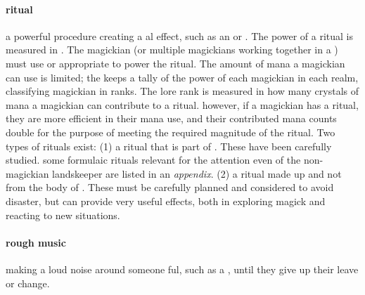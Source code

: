 \paragraph{ritual} a powerful procedure creating a al effect, such as an  or . The power of a ritual is measured in . The magickian (or multiple magickians working together in a ) must use  or appropriate  to power the ritual. The amount of mana a magickian can use is limited; the  keeps a tally of the power of each magickian in each realm, classifying magickian in  ranks. The lore rank is measured in how many crystals of mana a magickian can contribute to a ritual. however, if a magickian has  a ritual, they are more efficient in their mana use, and their contributed mana counts double for the purpose of meeting the required magnitude of the ritual. Two types of rituals exist: (1)  a ritual that is part of . These have been carefully studied. some formulaic rituals relevant for the attention even of the non-magickian landskeeper are listed in an \emph{appendix}. (2)  a ritual made up and not from the body of . These must be carefully planned and considered to avoid disaster, but can provide very useful effects, both in exploring magick and reacting to new situations.
\paragraph{rough music} making a loud noise around someone ful, such as a , until they give up their leave or change. 
